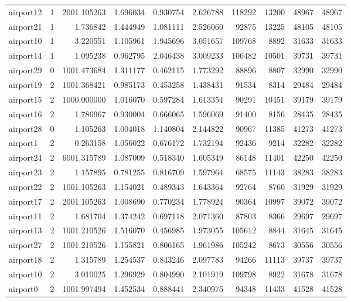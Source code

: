 \begin{longtable}{|l|r|r|r|r|r|r|r|r|r|}
airport12 & 1 & 2001.105263 & 1.696034 & 0.930754 & 2.626788 & 118292 & 13200 & 48967 & 48967 \\
airport21 & 1 & 1.736842 & 1.444949 & 1.081111 & 2.526060 & 92875 & 13225 & 48105 & 48105 \\
airport10 & 1 & 3.220551 & 1.105961 & 1.945696 & 3.051657 & 109768 & 8892 & 31633 & 31633 \\
airport14 & 1 & 1.095238 & 0.962795 & 2.046438 & 3.009233 & 106482 & 10501 & 39731 & 39731 \\
airport29 & 0 & 1001.473684 & 1.311177 & 0.462115 & 1.773292 & 88896 & 8807 & 32990 & 32990 \\
airport19 & 2 & 1001.368421 & 0.985173 & 0.453258 & 1.438431 & 91534 & 8314 & 29484 & 29484 \\
airport15 & 2 & 1000.000000 & 1.016070 & 0.597284 & 1.613354 & 90291 & 10451 & 39179 & 39179 \\
airport16 & 2 & 1.786967 & 0.930004 & 0.666065 & 1.596069 & 91400 & 8156 & 28435 & 28435 \\
airport28 & 0 & 1.105263 & 1.004018 & 1.140804 & 2.144822 & 90967 & 11385 & 41273 & 41273 \\
airport1 & 2 & 0.263158 & 1.056022 & 0.676172 & 1.732194 & 92436 & 9214 & 32282 & 32282 \\
airport24 & 2 & 6001.315789 & 1.087009 & 0.518340 & 1.605349 & 86148 & 11401 & 42250 & 42250 \\
airport23 & 2 & 1.157895 & 0.781255 & 0.816709 & 1.597964 & 68575 & 11143 & 38283 & 38283 \\
airport22 & 2 & 1001.105263 & 1.154021 & 0.489343 & 1.643364 & 92764 & 8760 & 31929 & 31929 \\
airport17 & 2 & 2001.105263 & 1.008690 & 0.770234 & 1.778924 & 90364 & 10997 & 39072 & 39072 \\
airport11 & 2 & 1.681704 & 1.374242 & 0.697118 & 2.071360 & 87803 & 8366 & 29697 & 29697 \\
airport13 & 2 & 1001.210526 & 1.516070 & 0.456985 & 1.973055 & 105612 & 8844 & 31645 & 31645 \\
airport27 & 2 & 1001.210526 & 1.155821 & 0.806165 & 1.961986 & 105242 & 8673 & 30556 & 30556 \\
airport18 & 2 & 1.315789 & 1.254537 & 0.843246 & 2.097783 & 94266 & 11113 & 39737 & 39737 \\
airport10 & 2 & 3.010025 & 1.296929 & 0.804990 & 2.101919 & 109798 & 8922 & 31678 & 31678 \\
airport0 & 2 & 1001.997494 & 1.452534 & 0.888441 & 2.340975 & 94348 & 11433 & 41528 & 41528 \\

\end{longtable}
